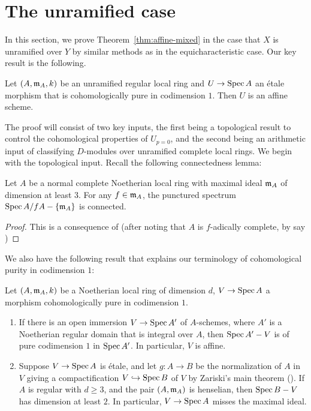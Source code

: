 \section{The unramified case}
In this section, we prove Theorem~\ref{thm:affine-mixed} in the case that $X$ is unramified over $Y$ by similar methods as in the equicharacteristic case.
Our key result is the following.
\begin{theorem}\label{thm:cohpureunram}
Let $(A, \mathfrak{m}_A,k)$ be an unramified regular local ring and $U \rightarrow \operatorname{Spec}{A}$ an \'{e}tale morphism that is cohomologically pure in codimension $1$.
Then $U$ is an affine scheme.
\end{theorem}
The proof will consist of two key inputs, the first being a topological result to control the cohomological properties of $U_{p=0}$, 
and the second being an arithmetic input of classifying $D$-modules over unramified complete local rings. We begin with the topological input. 
Recall the following connectedness lemma: 
\begin{theorem}\label{thm:connectedness}
Let $A$ be a normal complete Noetherian local ring with maximal ideal $\mathfrak{m}_A$ of dimension at least $3$. For any $f \in \mathfrak{m}_A$,
the punctured spectrum $\operatorname{Spec}{A/fA} - \{\mathfrak{m}_A\}$ is connected.
\end{theorem}
\begin{proof}
This is a consequence of \cite[0EG3]{sp} (after noting that $A$ is $f$-adically complete, by say \cite[090T]{sp})
\end{proof}
We also have the following result that explains our terminology of cohomological purity in codimension $1$:
\begin{lemma}\label{lem:cohpuretop}
Let $(A,\mathfrak{m}_A,k)$ be a Noetherian local ring of dimension $d$, $V \rightarrow \operatorname{Spec}{A}$ a morphism cohomologically pure in codimension $1$.
\begin{enumerate}
\item[(i)] If there is an open immersion $V \rightarrow \operatorname{Spec}{A'}$ of $A$-schemes, where $A'$ is a Noetherian regular domain that is integral over $A$, 
then $\operatorname{Spec}{A'} - V$ is of pure codimension $1$ in $\operatorname{Spec}{A'}$. In particular, $V$ is affine. 
\item[(ii)] Suppose $V \rightarrow \operatorname{Spec}{A}$ is \'{e}tale, and let 
$g: A \to B$ be the normalization of $A$ in $V$ giving a compactification 
$V \hookrightarrow \operatorname{Spec}{B}$ of $V$ by Zariski's main theorem (\cite[02LR]{sp}). If $A$ is regular with $d \ge 3$, 
and the pair $(A, \mathfrak{m}_A)$ is henselian,
then $\operatorname{Spec}{B} - V$ has dimension at least $2$. In particular, $V \rightarrow \operatorname{Spec}{A}$ misses the maximal ideal.
\end{enumerate}
\end{lemma}

